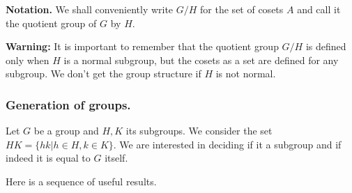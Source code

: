 \documentclass[12pt]{article}
\begin{document}
{\bf Notation.} We shall conveniently write $G/H$ for the set of cosets
$A$ and call it the quotient group of $G$ by $H$.

{\bf Warning:} It is important to remember that the quotient group $G/H$
is defined only when $H$ is a normal subgroup, but the cosets as a set
are defined for any subgroup. We don't get the group structure if $H$ is
not normal.

\subsubsection{Generation of groups.}
Let $G$ be a group and $H,K$ its subgroups.
We consider the set $HK = \{hk|h\in H,k\in K\}$. We are interested in
deciding if it a subgroup and if indeed it is equal to $G$ itself.

Here is a sequence of useful results.
\end{document}
